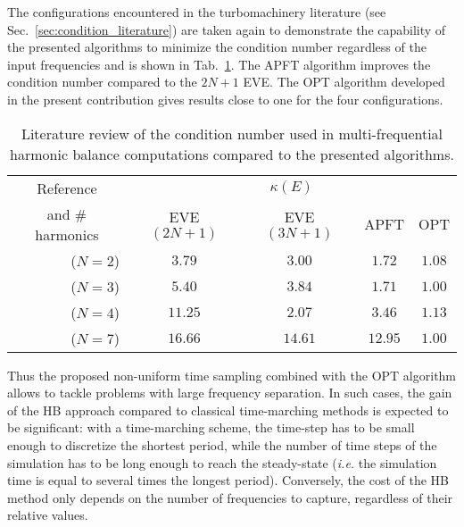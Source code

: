 The configurations encountered in the turbomachinery literature 
(see Sec.~\ref{sec:condition_literature})
are taken again to demonstrate the capability of the presented
algorithms to minimize the condition number
regardless of the input frequencies and is shown in 
Tab.~\ref{tab:literature_multistage2}.
The APFT algorithm improves the condition number compared to the
$2N+1$ EVE. The OPT algorithm developed in the
present contribution gives results close to one for the four configurations.
\begin{table}[htb]
  \centering
  \begin{tabular}{rcccc}
    \toprule
    \multicolumn{1}{c}{Reference} & \multicolumn{4}{c}{$\kappa(E)$} \\
    \multicolumn{1}{c}{and \# harmonics} & EVE $(2N+1)$ & EVE $(3N+1)$ & APFT & OPT \\
    \midrule
    \citet{Gopinath2007} ($N=2$) & $\mathbf{3.79}$ & $3.00$ & $1.72$ & $1.08$ \\
    \citet{Ekici2007} ($N=3$) & $5.40$ & $\mathbf{3.84}$ & $1.71$ & $1.00$ \\
    \citet{Gopinath2007} ($N=4$) & $\mathbf{11.25}$ & $2.07$ & $3.46$ & $1.13$ \\
    \citet{Gopinath2007} ($N=7$) & $\mathbf{16.66}$ & $14.61$ & $12.95$ & $1.00$ \\
    \bottomrule
  \end{tabular}
  \caption{Literature review of the condition number used in multi-frequential
  harmonic balance computations compared to the presented algorithms.}
  \label{tab:literature_multistage2}
\end{table}

Thus the proposed non-uniform time sampling combined with the OPT
algorithm allows to tackle problems with large frequency
separation. In such cases, the gain of the HB approach compared
to classical time-marching methods is expected to be significant: with
a time-marching scheme, the time-step has to be small enough to
discretize the shortest period, while the number of time steps of the
simulation has to be long enough to reach the steady-state
(\emph{i.e.}  the simulation time is equal to several
times the longest period). Conversely, the cost of the HB method only
depends on the number of frequencies to capture, regardless of their
relative values.

